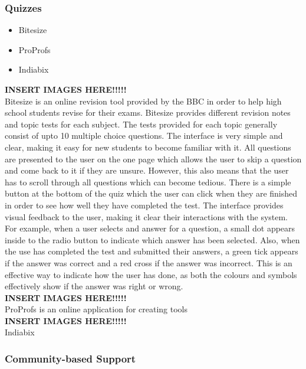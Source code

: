 \documentclass{article}
\begin{document}
\subsubsection{Quizzes}

\begin{itemize}
\item Bitesize
\item ProProfs
\item Indiabix
\end{itemize}

\textbf{INSERT IMAGES HERE!!!!!}\\

Bitesize is an online revision tool provided by the BBC in order to help high school students revise for their exams. Bitesize provides different revision notes and topic tests for each subject. The tests provided for each topic generally consist of upto 10 multiple choice questions. The interface is very simple and clear, making it easy for new students to become familiar with it. All questions are presented to the user on the one page which allows the user to skip a question and come back to it if they are unsure. However, this also means that the user has to scroll through all questions which can become tedious. There is a simple button at the bottom of the quiz which the user can click when they are finished in order to see how well they have completed the test. The interface provides visual feedback to the user, making it clear their interactions with the system. For example, when a user selects and answer for a question, a small dot appears inside to the radio button to indicate which answer has been selected. Also, when the use has completed the test and submitted their answers, a green tick appears if the answer was correct and a red cross if the answer was incorrect. This is an effective way to indicate how the user has done, as both the colours and symbols effectively show if the answer was right or wrong.\\

\textbf{INSERT IMAGES HERE!!!!!}\\

ProProfs is an online application for creating tools\\

\textbf{INSERT IMAGES HERE!!!!!}\\

Indiabix \\

\subsubsection{Community-based Support}
\end{document}
